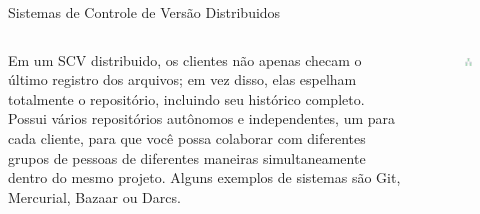 \documentclass[12pt]{beamer}
\begin{document}
\begin{frame}{Sistemas de Controle de Versão Distribuidos}
	\begin{columns}
	    \begin{column}{0.5\textwidth}  %
	      \begin{center}
	      		\justifying
		 		Em um SCV distribuido, os clientes não apenas checam o último registro dos arquivos; em vez disso, elas espelham totalmente o repositório, incluindo seu histórico completo. Possui vários repositórios autônomos e independentes, um para cada cliente, para que você possa colaborar com diferentes grupos de pessoas de diferentes maneiras simultaneamente dentro do mesmo projeto. Alguns exemplos de sistemas são Git, Mercurial, Bazaar ou Darcs.
			\end{center}
	    \end{column}\begin{column}{0.5\textwidth}
			\begin{figure}[!htb]
      		\centering
            \includegraphics[scale=0.4]{figuras/fig8.png} 
         \end{figure}
	    \end{column}
	    
	\end{columns}
\end{frame}
\end{document}
